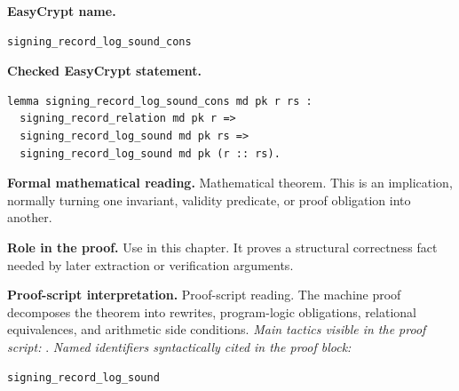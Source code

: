 \begin{formaltheorem}
\noindent\textbf{EasyCrypt name.}
\begin{lstlisting}[language=EasyCrypt,basicstyle=\ttfamily\scriptsize]
signing_record_log_sound_cons
\end{lstlisting}
\noindent\textbf{Checked EasyCrypt statement.}
\begin{lstlisting}[language=EasyCrypt,basicstyle=\ttfamily\scriptsize]
lemma signing_record_log_sound_cons md pk r rs :
  signing_record_relation md pk r =>
  signing_record_log_sound md pk rs =>
  signing_record_log_sound md pk (r :: rs).
\end{lstlisting}
\noindent\textbf{Formal mathematical reading.}
Mathematical theorem. This is an implication, normally turning one invariant, validity predicate, or proof obligation into another.

\noindent\textbf{Role in the proof.}
Use in this chapter. It proves a structural correctness fact needed by later extraction or verification arguments.

\noindent\textbf{Proof-script interpretation.}
Proof-script reading. The machine proof decomposes the theorem into rewrites, program-logic obligations, relational equivalences, and arithmetic side conditions.
\emph{Main tactics visible in the proof script:} .
\emph{Named identifiers syntactically cited in the proof block:}
\begin{lstlisting}[language=EasyCrypt,basicstyle=\ttfamily\scriptsize]
signing_record_log_sound
\end{lstlisting}

\end{formaltheorem}

